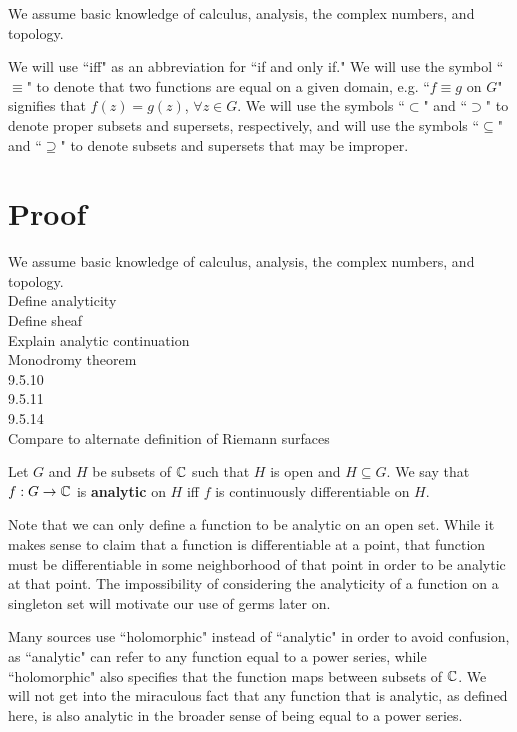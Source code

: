 \documentclass{article}
\begin{document}
We assume basic knowledge of calculus, analysis, the complex numbers, and topology.

We will use ``iff" as an abbreviation for ``if and only if." We will use the symbol ``$\equiv$" to denote that two functions are equal on a given domain, e.g. ``$f\equiv g$ on $G$" signifies that $f(z) = g(z)$, $\forall z\in G$. We will use the symbols ``$\subset$" and ``$\supset$" to denote proper subsets and supersets, respectively, and will use the  symbols ``$\subseteq$" and ``$\supseteq$" to denote subsets and supersets that may be improper.

\section{Proof}
We assume basic knowledge of calculus, analysis, the complex numbers, and topology.\\
Define analyticity\\
Define sheaf\\
Explain analytic continuation\\
Monodromy theorem\\
9.5.10\\
9.5.11\\
9.5.14\\
Compare to alternate definition of Riemann surfaces\\

\begin{definition}
	Let $G$ and $H$ be subsets of $\mathbb{C}$ such that $H$ is open and $H\subseteq G$. We say that $f:G\rightarrow\mathbb{C}$ is \textbf{analytic} on $H$ iff $f$ is continuously differentiable on $H$.
\end{definition}

Note that we can only define a function to be analytic on an open set. While it makes sense to claim that a function is differentiable at a point, that function must be differentiable in some neighborhood of that point in order to be analytic at that point. The impossibility of considering the analyticity of a function on a singleton set will motivate our use of germs later on.

Many sources use ``holomorphic" instead of ``analytic" in order to avoid confusion, as ``analytic" can refer to any function equal to a power series, while ``holomorphic" also specifies that the function maps between subsets of $\mathbb{C}$. We will not get into the miraculous fact that any function that is analytic, as defined here, is also analytic in the broader sense of being equal to a power series.
\end{document}
